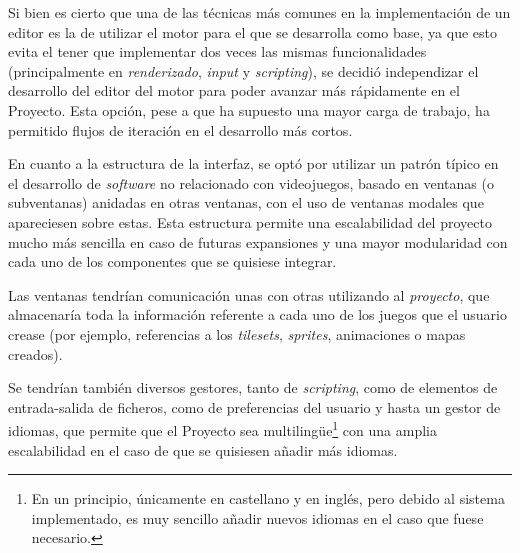 \medskip

Si bien es cierto que una de las técnicas más comunes en la implementación de un editor es la de utilizar el motor para el que se desarrolla como base, ya que esto evita el tener que implementar dos veces las mismas funcionalidades (principalmente en \textit{renderizado}, \textit{input} y \textit{scripting}), se decidió independizar el desarrollo del editor del motor para poder avanzar más rápidamente en el Proyecto. Esta opción, pese a que ha supuesto una mayor carga de trabajo, ha permitido flujos de iteración en el desarrollo más cortos.

\medskip

En cuanto a la estructura de la interfaz, se optó por utilizar un patrón típico en el desarrollo de \textit{software} no relacionado con videojuegos, basado en ventanas (o subventanas) anidadas en otras ventanas, con el uso de ventanas modales que apareciesen sobre estas. Esta estructura permite una escalabilidad del proyecto mucho más sencilla en caso de futuras expansiones y una mayor modularidad con cada uno de los componentes que se quisiese integrar.

\medskip

Las ventanas tendrían comunicación unas con otras utilizando al \textit{proyecto}, que almacenaría toda la información referente a cada uno de los juegos que el usuario crease (por ejemplo, referencias a los \textit{tilesets}, \textit{sprites}, animaciones o mapas creados).

\smallskip

Se tendrían también diversos gestores, tanto de \textit{scripting}, como de elementos de entrada-salida de ficheros, como de preferencias del usuario y hasta un gestor de idiomas, que permite que el Proyecto sea multilingüe\footnote{En un principio, únicamente en castellano y en inglés, pero debido al sistema implementado, es muy sencillo añadir nuevos idiomas en el caso que fuese necesario.} con una amplia escalabilidad en el caso de que se quisiesen añadir más idiomas.
